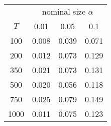 % 
\begin{tabular}{cccc}
  \hline
  & \multicolumn{3}{c}{nominal size $\alpha$} \\
 $T$ & 0.01 & 0.05 & 0.1 \\
 \hline
100 & 0.008 & 0.039 & 0.071 \\ 
  200 & 0.012 & 0.073 & 0.129 \\ 
  350 & 0.021 & 0.073 & 0.131 \\ 
  500 & 0.020 & 0.056 & 0.118 \\ 
  750 & 0.025 & 0.079 & 0.149 \\ 
  1000 & 0.011 & 0.075 & 0.123 \\ 
   \hline
\end{tabular}
